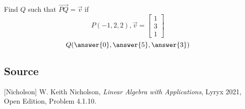 \documentclass{ximera}
\author{}
\begin{document}
\begin{exercise}
Find $Q$ such that $\overrightarrow{PQ}=\vec{v}$ if 
$$P(-1, 2, 2), \vec{v}=\begin{bmatrix}1\\3\\1\end{bmatrix}$$
$$Q(\answer{0},\answer{5},\answer{3})$$

 
\end{exercise}

\subsection*{Source}
[Nicholson] W. Keith Nicholson, {\it Linear Algebra with Applications}, Lyryx 2021, Open Edition, Problem 4.1.10.
\end{document}
